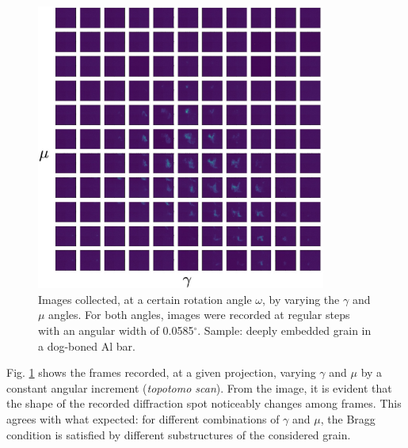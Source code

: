 \documentclass[11pt]{scrartcl}
\begin{document}
\begin{figure}[h!]
    \centering
    \includegraphics[width=0.85\textwidth]{Img_one_proj}
    \caption{Images collected, at a certain rotation angle $\omega$, by varying the $\gamma$ and $\mu$ angles. For both angles, images were recorded at regular steps with an angular width of 0.0585$^{\circ}$. Sample: deeply embedded grain in a dog-boned Al bar.}
    \label{fig:all_pics_one_om}
\end{figure}

Fig. \ref{fig:all_pics_one_om} shows the frames recorded, at a given projection, varying $\gamma$ and $\mu$ by a constant angular increment ({\emph{topotomo scan}}). From the image, it is evident that the shape of the recorded diffraction spot noticeably changes among frames. This agrees with what expected: for different combinations of $\gamma$ and $\mu$, the Bragg condition is satisfied by different substructures of the considered grain.
\end{document}
